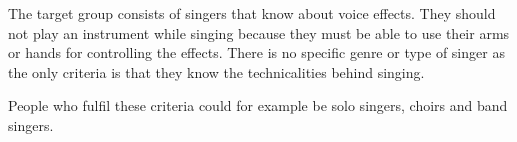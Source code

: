 The target group consists of singers that know about voice effects. They should not play an instrument while singing because they must be able to use their arms or hands for controlling the effects. There is no specific genre or type of singer as the only criteria is that they know the technicalities behind singing.

People who fulfil these criteria could for example be solo singers, choirs and band singers.
